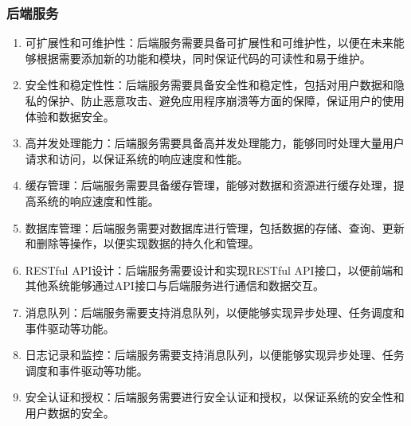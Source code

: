 \documentclass[UTF8]{ctexart}
\newcommand{\m}[1]{\textcolor{modify}{#1}}
\begin{document}
    \subsubsection{后端服务}
    \m{
        \begin{enumerate}
            \item 可扩展性和可维护性：后端服务需要具备可扩展性和可维护性，以便在未来能够根据需要添加新的功能和模块，同时保证代码的可读性和易于维护。
            \item 安全性和稳定性性：后端服务需要具备安全性和稳定性，包括对用户数据和隐私的保护、防止恶意攻击、避免应用程序崩溃等方面的保障，保证用户的使用体验和数据安全。
            \item 高并发处理能力：后端服务需要具备高并发处理能力，能够同时处理大量用户请求和访问，以保证系统的响应速度和性能。
            \item 缓存管理：后端服务需要具备缓存管理，能够对数据和资源进行缓存处理，提高系统的响应速度和性能。
            \item 数据库管理：后端服务需要对数据库进行管理，包括数据的存储、查询、更新和删除等操作，以便实现数据的持久化和管理。
            \item RESTful API设计：后端服务需要设计和实现RESTful API接口，以便前端和其他系统能够通过API接口与后端服务进行通信和数据交互。
            \item 消息队列：后端服务需要支持消息队列，以便能够实现异步处理、任务调度和事件驱动等功能。
            \item 日志记录和监控：后端服务需要支持消息队列，以便能够实现异步处理、任务调度和事件驱动等功能。
            \item 安全认证和授权：后端服务需要进行安全认证和授权，以保证系统的安全性和用户数据的安全。
        \end{enumerate}
    }
\end{document}
